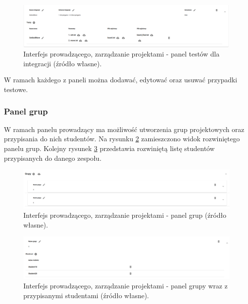 \begin{figure}[h]
    \centering
    \includegraphics[width = 15cm]{chapter04/lecturer_integrations_tests.png}
    \caption{Interfejs prowadzącego, zarządzanie projektami - panel testów dla integracji (źródło własne).}
    \label{fig:lecturer_integrations_tests}
\end{figure}

W ramach każdego z paneli można dodawać, edytować oraz usuwać przypadki testowe.

\subsubsection{Panel grup}

W ramach panelu prowadzący ma możliwość utworzenia grup projektowych oraz przypisania do nich studentów.
Na rysunku \ref{fig:lecturer_groups} zamieszczono widok rozwiniętego panelu grup.
Kolejny rysunek \ref{fig:lecturer_students_in_group} przedstawia rozwiniętą listę studentów przypisanych do danego zespołu.

\begin{figure}[h]
    \centering
    \includegraphics[width = 13cm]{chapter04/lecturer_groups.png}
    \caption{Interfejs prowadzącego, zarządzanie projektami - panel grup (źródło własne).}
    \label{fig:lecturer_groups}
\end{figure}

\begin{figure}[h]
    \centering
    \includegraphics[width = 13cm]{chapter04/lecturer_students_in_group.png}
    \caption{Interfejs prowadzącego, zarządzanie projektami - panel grupy wraz z przypisanymi studentami (źródło własne).}
    \label{fig:lecturer_students_in_group}
\end{figure}

